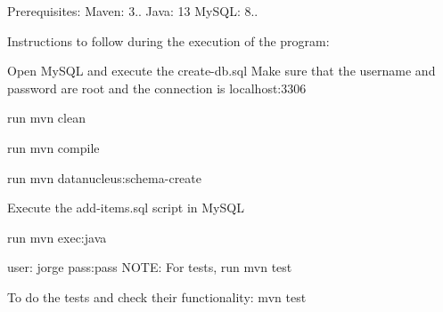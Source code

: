 Prerequisites\+: Maven\+: 3.. Java\+: 13 My\+S\+QL\+: 8..

Instructions to follow during the execution of the program\+:
\begin{DoxyEnumerate}
\item Open My\+S\+QL and execute the create-\/db.\+sql Make sure that the username and password are root and the connection is localhost\+:3306
\item run mvn clean
\item run mvn compile
\item run mvn datanucleus\+:schema-\/create
\item Execute the add-\/items.\+sql script in My\+S\+QL
\item run mvn exec\+:java
\item user\+: jorge pass\+:pass N\+O\+TE\+: For tests, run mvn test
\end{DoxyEnumerate}

To do the tests and check their functionality\+: mvn test 